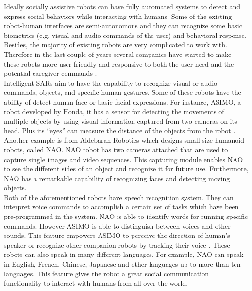Ideally socially assistive robots can have fully automated systems to detect and
express social behaviors while interacting with humans. Some of the existing robot-human
interfaces are semi-autonomous and they can recognize some basic biometrics (e.g. visual
and audio commands of the user) and behavioral response. Besides, the majority of existing
robots are very complicated to work with. Therefore in the last couple of years several
companies have started to make these robots more user-friendly and responsive to both the
user need and the potential caregiver commands \cite{DefineSocial2005}.\\

Intelligent SARs aim to have the capability to recognize visual or audio commands,
objects, and specific human gestures. Some of these robots have the ability of detect human
face or basic facial expressions. For instance, ASIMO, a robot developed by Honda, it has
a sensor for detecting the movements of multiple objects by using visual information
captured from two cameras on its head. Plus its “eyes” can measure the distance of the
objects from the robot \cite{ASIMO2011}. Another example is from Aldebaran Robotics which designs
small size humanoid robots, called NAO. NAO robot has two cameras attached that are
used to capture single images and video sequences. This capturing module enables NAO
to see the different sides of an object and recognize it for future use. Furthermore, NAO
has a remarkable capability of recognizing faces and detecting moving objects.\\

Both of the aforementioned robots have speech recognition system. They can interpret
voice commands to accomplish a certain set of tasks which have been pre-programmed in
the system. NAO is able to identify words for running specific commands. However
ASIMO is able to distinguish between voices and other sounds. This feature empowers
ASIMO to perceive the direction of human’s speaker or recognize other companion robots
by tracking their voice \cite{DSMIV2000}. These robots can also speak in many different languages. For
example, NAO can speak in English, French, Chinese, Japanese and other languages up to
more than ten languages. This feature gives the robot a great social communication
functionality to interact with humans from all over the world.\\



